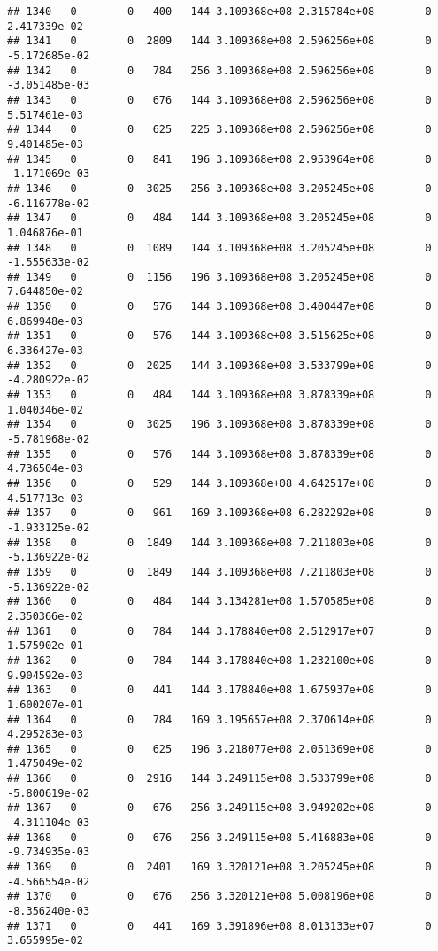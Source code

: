 \documentclass[
]{article}
\begin{document}
\begin{enumerate}
\begin{verbatim}
## 1340   0        0   400   144 3.109368e+08 2.315784e+08        0  2.417339e-02
## 1341   0        0  2809   144 3.109368e+08 2.596256e+08        0 -5.172685e-02
## 1342   0        0   784   256 3.109368e+08 2.596256e+08        0 -3.051485e-03
## 1343   0        0   676   144 3.109368e+08 2.596256e+08        0  5.517461e-03
## 1344   0        0   625   225 3.109368e+08 2.596256e+08        0  9.401485e-03
## 1345   0        0   841   196 3.109368e+08 2.953964e+08        0 -1.171069e-03
## 1346   0        0  3025   256 3.109368e+08 3.205245e+08        0 -6.116778e-02
## 1347   0        0   484   144 3.109368e+08 3.205245e+08        0  1.046876e-01
## 1348   0        0  1089   144 3.109368e+08 3.205245e+08        0 -1.555633e-02
## 1349   0        0  1156   196 3.109368e+08 3.205245e+08        0  7.644850e-02
## 1350   0        0   576   144 3.109368e+08 3.400447e+08        0  6.869948e-03
## 1351   0        0   576   144 3.109368e+08 3.515625e+08        0  6.336427e-03
## 1352   0        0  2025   144 3.109368e+08 3.533799e+08        0 -4.280922e-02
## 1353   0        0   484   144 3.109368e+08 3.878339e+08        0  1.040346e-02
## 1354   0        0  3025   196 3.109368e+08 3.878339e+08        0 -5.781968e-02
## 1355   0        0   576   144 3.109368e+08 3.878339e+08        0  4.736504e-03
## 1356   0        0   529   144 3.109368e+08 4.642517e+08        0  4.517713e-03
## 1357   0        0   961   169 3.109368e+08 6.282292e+08        0 -1.933125e-02
## 1358   0        0  1849   144 3.109368e+08 7.211803e+08        0 -5.136922e-02
## 1359   0        0  1849   144 3.109368e+08 7.211803e+08        0 -5.136922e-02
## 1360   0        0   484   144 3.134281e+08 1.570585e+08        0  2.350366e-02
## 1361   0        0   784   144 3.178840e+08 2.512917e+07        0  1.575902e-01
## 1362   0        0   784   144 3.178840e+08 1.232100e+08        0  9.904592e-03
## 1363   0        0   441   144 3.178840e+08 1.675937e+08        0  1.600207e-01
## 1364   0        0   784   169 3.195657e+08 2.370614e+08        0  4.295283e-03
## 1365   0        0   625   196 3.218077e+08 2.051369e+08        0  1.475049e-02
## 1366   0        0  2916   144 3.249115e+08 3.533799e+08        0 -5.800619e-02
## 1367   0        0   676   256 3.249115e+08 3.949202e+08        0 -4.311104e-03
## 1368   0        0   676   256 3.249115e+08 5.416883e+08        0 -9.734935e-03
## 1369   0        0  2401   169 3.320121e+08 3.205245e+08        0 -4.566554e-02
## 1370   0        0   676   256 3.320121e+08 5.008196e+08        0 -8.356240e-03
## 1371   0        0   441   169 3.391896e+08 8.013133e+07        0  3.655995e-02

\end{verbatim}
\end{enumerate}
\end{document}
